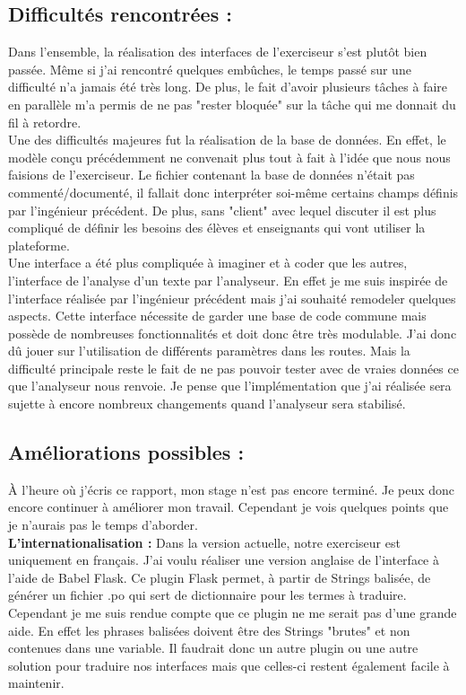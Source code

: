 \documentclass[12pt]{article}
\begin{document}
\subsection{Difficultés rencontrées :}

Dans l’ensemble, la réalisation des interfaces de l’exerciseur s’est plutôt bien passée. Même si j’ai rencontré quelques embûches, le temps passé sur une difficulté n’a jamais été très long. De plus, le fait d’avoir plusieurs tâches à faire en parallèle m’a permis de ne pas "rester bloquée" sur la tâche qui me donnait du fil à retordre. \\

Une des difficultés majeures fut la réalisation de la base de données. En effet, le modèle conçu précédemment ne convenait plus tout à fait à l'idée que nous nous faisions de l’exerciseur. Le fichier contenant la base de données n’était pas commenté/documenté, il fallait donc interpréter soi-même certains champs définis par l’ingénieur précédent.  De plus, sans "client" avec lequel discuter il est plus compliqué de définir les besoins des élèves et enseignants qui vont utiliser la plateforme. \\

Une interface a été plus compliquée à imaginer et à coder que les autres, l'interface de l'analyse d'un texte par l'analyseur. En effet je me suis inspirée de l'interface réalisée par l'ingénieur précédent mais j'ai souhaité remodeler quelques aspects. Cette interface nécessite de garder une base de code commune mais possède de nombreuses fonctionnalités et doit donc être très modulable. J'ai donc dû jouer sur l'utilisation de différents paramètres dans les routes. Mais la difficulté principale reste le fait de ne pas pouvoir tester avec de vraies données ce que l'analyseur nous renvoie. Je pense que l'implémentation que j'ai réalisée sera sujette à encore nombreux changements quand l'analyseur sera stabilisé. 

\subsection{Améliorations possibles :}
À l’heure où j’écris ce rapport, mon stage n’est pas encore terminé. Je peux donc encore continuer à améliorer mon travail. Cependant je vois quelques points que je n’aurais pas le temps d’aborder. \\

\textbf{L’internationalisation :} Dans la version actuelle, notre exerciseur est uniquement en français. J’ai voulu réaliser une version anglaise de l’interface à l’aide de Babel Flask. Ce plugin Flask permet, à partir de Strings balisée, de générer un fichier .po qui sert de dictionnaire pour les termes à traduire. Cependant je me suis rendue compte que ce plugin ne me serait pas d’une grande aide. En effet les phrases balisées doivent être des Strings "brutes" et non contenues dans une variable. Il faudrait donc un autre plugin ou une autre solution pour traduire nos interfaces mais que celles-ci restent également facile à maintenir. \\
\end{document}
